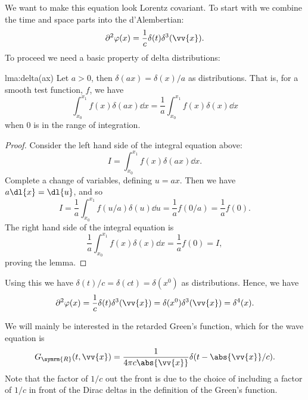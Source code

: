 We want to make this equation look Lorentz covariant.
To start with we combine the time and space parts into the d'Alembertian:
\begin{equation}
    \dalembertian \varphi(x) = \frac{1}{c} \delta(t) \delta^3(\vv{x}).
\end{equation}
To proceed we need a basic property of delta distributions:
\begin{lma}{}{lma:delta(ax)}
    Let \(a > 0\), then \(\delta(ax) = \delta(x)/a\) as distributions.
    That is, for a smooth test function, \(f\), we have
    \begin{equation}
        \int_{x_0}^{x_1} f(x) \delta(ax) \dd{x} = \frac{1}{a} \int_{x_0}^{x_1} f(x) \delta(x) \dd{x}
    \end{equation}
    when \(0\) is in the range of integration.
    
    \begin{proof}
        Consider the left hand side of the integral equation above:
        \begin{equation}
            I = \int_{x_0}^{x_1} f(x) \delta(ax) \dd{x}.
        \end{equation}
        Complete a change of variables, defining \(u = ax\).
        Then we have \(a\dl{x} = \dl{u}\), and so 
        \begin{equation}
            I = \frac{1}{a} \int_{x_0}^{x_1} f(u/a) \delta(u) \dd{u} = \frac{1}{a} f(0/a) = \frac{1}{a} f(0).
        \end{equation}
        The right hand side of the integral equation is
        \begin{equation}
            \frac{1}{a} \int_{x_0}^{x_1} f(x) \delta(x) \dd{x} = \frac{1}{a} f(0) = I,
        \end{equation}
        proving the lemma.
    \end{proof}
\end{lma}

Using this we have \(\delta(t)/c = \delta(ct) = \delta(x^0)\) as distributions.
Hence, we have
\begin{equation}
    \dalembertian \varphi(x) = \frac{1}{c} \delta(t) \delta^3(\vv{x}) = \delta(x^0)\delta^3(\vv{x}) = \delta^4(x).
\end{equation}

We will mainly be interested in the retarded Green's function, which for the wave equation is
\begin{equation}
    G_{\symrm{R}}(t, \vv{x}) = \frac{1}{4\pi c \abs{\vv{x}}} \delta(t - \abs{\vv{x}}/c).
\end{equation}
Note that the factor of \(1/c\) out the front is due to the choice of including a factor of \(1/c\) in front of the Dirac deltas in the definition of the Green's function.

